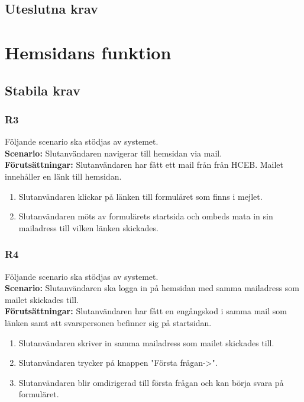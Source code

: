 \documentclass{article}
\begin{document}
    \subsection*{Uteslutna krav}
    
    \section{Hemsidans funktion}
    
    \subsection*{Stabila krav}
    
      \subsubsection*{R3}
    Följande scenario ska stödjas av systemet.
        \\
       \indent \textbf{Scenario:} Slutanvändaren navigerar till hemsidan via mail.
        \\
       \indent \textbf{Förutsättningar:} Slutanvändaren har fått ett mail från från HCEB. Mailet innehåller en länk till hemsidan.
            \begin{enumerate}
                \item Slutanvändaren klickar på länken till formuläret som finns i mejlet.
                \item Slutanvändaren möts av formulärets startsida och ombeds mata in sin mailadress till vilken länken skickades. 
            \end{enumerate}
            
        \subsubsection*{R4}
    Följande scenario ska stödjas av systemet.
        \\
       \indent \textbf{Scenario:} Slutanvändaren ska logga in på hemsidan med samma mailadress som mailet skickades till.
        \\
       \indent \textbf{Förutsättningar:} Slutanvändaren har fått en engångskod i samma mail som länken samt att svarspersonen befinner sig på startsidan.
            \begin{enumerate}
               \item Slutanvändaren skriver in samma mailadress som mailet skickades till.
               \item Slutanvändaren trycker på knappen "Första frågan->".
                \item  Slutanvändaren blir omdirigerad till första frågan och kan börja svara på formuläret.
            \end{enumerate}
   
\end{document}
